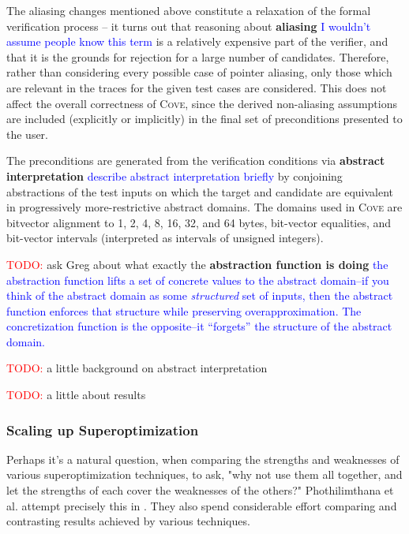 \documentclass[12pt,twoside]{reedthesis}
\newcommand{\red}[1]{\textcolor{red}{#1}}
\newcommand{\comment}[2]{\textbf{#1} \textcolor{blue}{#2}}
\begin{document}
The aliasing changes mentioned above constitute a relaxation of the formal verification process -- it turns out that reasoning about
    \comment{aliasing}{I wouldn't assume people know this term}
    is a relatively expensive part of the verifier, and that it is the grounds for rejection for a large number of candidates.
Therefore, rather than considering every possible case of pointer aliasing, only those which are relevant in the traces for the given test cases are considered.
This does not affect the overall correctness of \textsc{Cove}, since the derived non-aliasing assumptions are included (explicitly or implicitly) in the final set of preconditions presented to the user.
    
The preconditions are generated from the verification conditions via
    \comment{abstract interpretation}{describe abstract interpretation briefly}
    by conjoining abstractions of the test inputs on which the target and candidate are equivalent in progressively more-restrictive abstract domains.
The domains used in \textsc{Cove} are bitvector alignment to 1, 2, 4, 8, 16, 32, and 64 bytes, bit-vector equalities, and bit-vector intervals (interpreted as intervals of unsigned integers).
    
\red{TODO:} ask Greg about what exactly the \comment{abstraction function is doing}{the abstraction function lifts a set of concrete values to the abstract domain--if you think of the abstract domain as some \emph{structured} set of inputs, then the abstract function enforces that structure while preserving overapproximation. The concretization function is the opposite--it ``forgets'' the structure of the abstract domain.}
    
\red{TODO:} a little background on abstract interpretation
    
\red{TODO:} a little about results

\subsubsection{Scaling up Superoptimization}

Perhaps it's a natural question, when comparing the strengths and weaknesses of various superoptimization techniques, to ask, "why not use them all together, and let the strengths of each cover the weaknesses of the others?"
Phothilimthana et al. attempt precisely this in \cite{phothilimthana2016scaling}.
They also spend considerable effort comparing and contrasting results achieved by various techniques.
    
\end{document}
